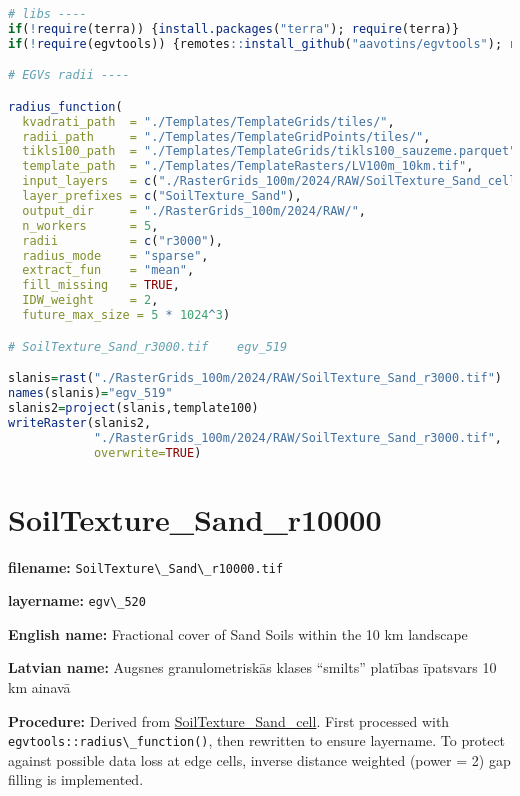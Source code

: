\documentclass[
]{book}
\newcommand{\passthrough}[1]{#1}
\begin{document}
\begin{lstlisting}[language=R]
# libs ----
if(!require(terra)) {install.packages("terra"); require(terra)}
if(!require(egvtools)) {remotes::install_github("aavotins/egvtools"); require(egvtools)}

# EGVs radii ----

radius_function(
  kvadrati_path  = "./Templates/TemplateGrids/tiles/",
  radii_path     = "./Templates/TemplateGridPoints/tiles/",
  tikls100_path  = "./Templates/TemplateGrids/tikls100_sauzeme.parquet",
  template_path  = "./Templates/TemplateRasters/LV100m_10km.tif",
  input_layers   = c("./RasterGrids_100m/2024/RAW/SoilTexture_Sand_cell.tif"),
  layer_prefixes = c("SoilTexture_Sand"),
  output_dir     = "./RasterGrids_100m/2024/RAW/",
  n_workers      = 5,
  radii          = c("r3000"),
  radius_mode    = "sparse",
  extract_fun    = "mean",
  fill_missing   = TRUE,
  IDW_weight     = 2,
  future_max_size = 5 * 1024^3)

# SoilTexture_Sand_r3000.tif    egv_519

slanis=rast("./RasterGrids_100m/2024/RAW/SoilTexture_Sand_r3000.tif")
names(slanis)="egv_519"
slanis2=project(slanis,template100)
writeRaster(slanis2,
            "./RasterGrids_100m/2024/RAW/SoilTexture_Sand_r3000.tif",
            overwrite=TRUE)
\end{lstlisting}

\section{SoilTexture\_Sand\_r10000}\label{ch06.520}

\textbf{filename:} \passthrough{\lstinline!SoilTexture\_Sand\_r10000.tif!}

\textbf{layername:} \passthrough{\lstinline!egv\_520!}

\textbf{English name:} Fractional cover of Sand Soils within the 10 km landscape

\textbf{Latvian name:} Augsnes granulometriskās klases ``smilts'' platības īpatsvars 10 km ainavā

\textbf{Procedure:} Derived from \hyperref[ch06.516]{SoilTexture\_Sand\_cell}. First processed
with \passthrough{\lstinline!egvtools::radius\_function()!}, then rewritten to ensure layername. To protect against
possible data loss at edge cells, inverse distance weighted (power = 2) gap filling
is implemented.
\end{document}
